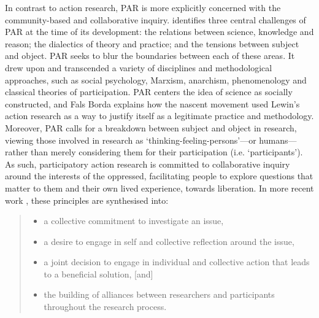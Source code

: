 In contrast to action research, PAR is more explicitly concerned with the community-based and collaborative inquiry. \citet{fals_borda_origins_2001} identifies three central challenges of PAR at the time of its development: the relations between science, knowledge and reason; the dialectics of theory and practice; and the tensions between subject and object. PAR seeks to blur the boundaries between each of these areas. It drew upon and transcended a variety of disciplines and methodological approaches, such as social psychology, Marxism, anarchism, phenomenology and classical theories of participation. PAR centers the idea of science as socially constructed, and Fals Borda explains how the nascent movement used Lewin’s action research as a way to justify itself as a legitimate practice and methodology. Moreover, PAR calls for a breakdown between subject and object in research, viewing those involved in research as ‘thinking-feeling-persons’—or humans—rather than merely considering them for their participation (i.e. ‘participants’). As such, participatory action research is committed to collaborative inquiry around the interests of the oppressed, facilitating people to explore questions that matter to them and their own lived experience, towards liberation. In more recent work \citep[p. 1]{mcintyre_participatory_2007}, these principles are synthesised into:
\begin{quote}
\begin{itemize}
    \item a collective commitment to investigate an issue,
    \item a desire to engage in self and collective reflection around the issue,
    \item a joint decision to engage in individual and collective action that leads to a beneficial solution, [and]
    \item the building of alliances between researchers and participants throughout the research process.
\end{itemize}
\end{quote}
